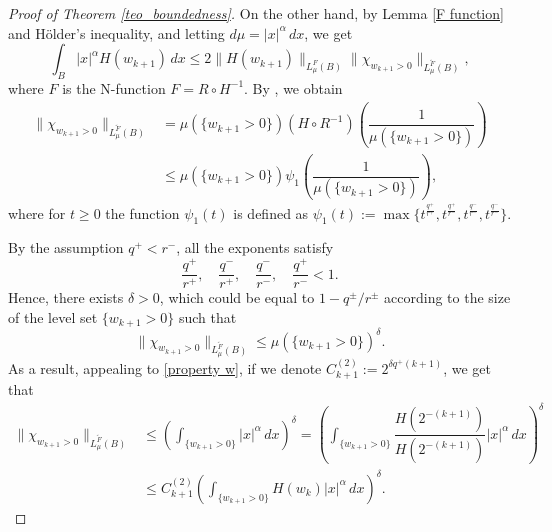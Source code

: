 \documentclass[leqno,twoside, 12pt]{amsart}
\theoremstyle{plain}
\numberwithin{equation}{section} \numberwithin{figure}{section}
\theoremstyle{definition}
\numberwithin{equation}{section}
\begin{document}
\begin{proof}[Proof of Theorem \ref{teo_boundedness}]
On the other hand, by Lemma \ref{F function} and H\"{o}lder's inequality, and letting $d\mu =|x|^{\alpha}\,dx$, we get
\begin{equation}\label{bound H and chi}
\int_B |x|^\alpha H(w_{k+1})\,dx \leq 2\|H(w_{k+1})\|_{L_{\mu}^F(B)}\|\chi_{w_{k+1}>0}\|_{L_\mu^{\tilde{F}}(B)},
\end{equation}where $F$ is the N-function $F=R\circ H^{-1}$. By \cite[Corollary 7]{RR}, we obtain
\begin{equation}\label{bound chi}
\begin{split}
\|\chi_{w_{k+1}>0}\|_{L_\mu^{\tilde{F}}(B)}&  = \mu(\{w_{k+1}>0\})(H\circ R^{-1})\left(\dfrac{1}{\mu(\{w_{k+1}>0\})} \right) \\ & \leq \mu(\{w_{k+1}>0\}) \psi_1 \left( \dfrac{1}{\mu(\{w_{k+1}>0\})} \right),
\end{split}
\end{equation}
where for $t\geq 0$ the function $\psi_1(t)$ is defined as $\psi_1(t):=\max\{t^\frac{q^+}{r^+}, t^\frac{q^+}{r^-}, t^\frac{q^-}{r^-}, t^\frac{q^-}{r^-}\}$.
 

By the assumption $q^{+}<r^{-}$, all the exponents satisfy 
$$\frac{q^{+}}{r^{+}}, \quad \frac{q^{-}}{r^{+}}, \quad \frac{q^{-}}{r^{-}}, \quad \frac{q^+}{r^-} <1.$$Hence, there exists $\delta>0$, which could be equal to $1-q^{\pm}/r^{\pm}$ according to the size of the level set $\{w_{k+1}>0\}$ such that
$$\|\chi_{w_{k+1}>0}\|_{L_\mu^{\tilde{F}}(B)} \leq \mu(\{w_{k+1}>0\})^{\delta}.$$As a result, appealing to \eqref{property w}, if we denote $C_{k+1}^{(2)}:=2^{\delta q^{+}(k+1)}$, we get that
%
\begin{equation}\label{ineq norm 1}
\begin{split}
\|\chi_{w_{k+1}>0}\|_{L_\mu^{\tilde{F}}(B)} & \leq \left(\int_{\{w_{k+1}>0\}}|x|^\alpha \,dx  \right)^{\delta}  = \left(\int_{\{w_{k+1}>0\}}\dfrac{H(2^{-(k+1)})}{H(2^{-(k+1)})} |x|^\alpha \,dx  \right)^{\delta} \\& \leq C_{k+1}^{(2)} \left(\int_{\{w_{k+1}>0\}}H(w_k) |x|^\alpha \,dx  \right)^{\delta}.
\end{split} 
\end{equation}



\end{proof}
\end{document}
